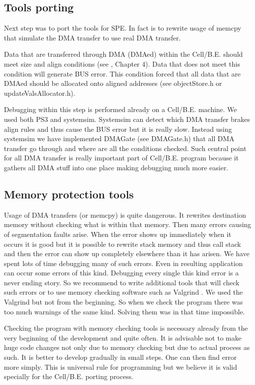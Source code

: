 \subsection{Tools porting}

\par
Next step was to port the tools for SPE.
In fact is to rewrite usage of memcpy that simulate the DMA transfer to use real DMA transfer.

\par
Data that are transferred through DMA (DMAed) within the Cell/B.E. should meet size and align conditions (see \cite{programmersGuide}, Chapter 4).
Data that does not meet this condition will generate BUS error.
This condition forced that all data that are DMAed should be allocated onto aligned addresses (see objectStore.h or updateValsAllocator.h).

\par
Debugging within this step is performed already on a Cell/B.E. machine.
We used both PS3 and systemsim.
Systemsim can detect which DMA transfer brakes align rules and thus cause the BUS error but it is really slow.
Instead using systemsim we have implemented DMAGate (see DMAGate.h) that all DMA transfer go through and where are all the conditions checked.
Such central point for all DMA transfer is really important part of Cell/B.E. program because it gathers all DMA stuff into one place making debugging much more easier.

\subsection{Memory protection tools}

\par
Usage of DMA transfers (or memcpy) is quite dangerous.
It rewrites destination memory without checking what is within that memory.
Then many errors causing of segmentation faults arise.
When the error shows up immediately when it occurs it is good but it is possible to rewrite stack memory and thus call stack and then the error can show up completely elsewhere than it has arisen.
We have spent lots of time debugging many of such errors.
Even in resulting application can occur some errors of this kind.
Debugging every single this kind error is a never ending story.
So we recommend to write additional tools that will check such errors or to use memory checking software such as Valgrind \cite{valgrind}.
We used the Valgrind but not from the beginning.
So when we check the program there was too much warnings of the same kind.
Solving them was in that time impossible.

\par
Checking the program with memory checking tools is necessary already from the very beginning of the development and quite often.
It is advisable not to make huge code changes not only due to memory checking but due to actual process as such.
It is better to develop gradually in small steps.
One can then find error more simply.
This is universal rule for programming but we believe it is valid specially for the Cell/B.E. porting process.
